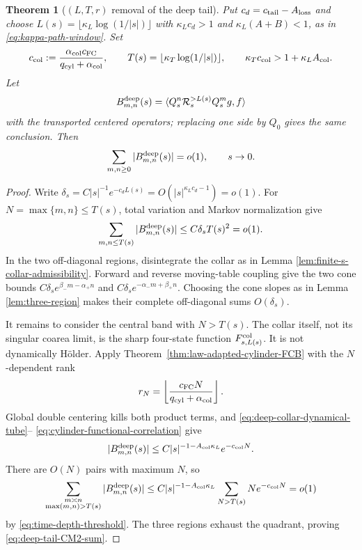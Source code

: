\documentclass[11pt]{article}
\newtheorem{theorem}{Theorem}[section]
\begin{document}
\begin{theorem}[$(L,T,r)$ removal of the deep tail]
\label{thm:time-depth-diagonal}
Put $c_d=c_{\rm tail}-A_{\rm loss}$ and choose
$L(s)=\lfloor\kappa_L\log(1/|s|)\rfloor$ with
$\kappa_Lc_d>1$ and $\kappa_L(A+B)<1$, as in
\eqref{eq:kappa-path-window}.  Set
\begin{equation}
\label{eq:time-depth-threshold}
 c_{\rm col}:=
 \frac{\alpha_{\rm col}c_{\rm FC}}
      {q_{\rm cyl}+\alpha_{\rm col}},\qquad
 T(s)=\lfloor\kappa_T\log(1/|s|)\rfloor,\qquad
 \kappa_Tc_{\rm col}>1+\kappa_LA_{\rm col}.
\end{equation}
Let
\[
 B^{\rm deep}_{m,n}(s)=
 \langle Q_s^n\mathcal R_s^{>L(s)}Q_s^mg,f\rangle
\]
with the transported centered operators; replacing one side by $Q_0$ gives
the same conclusion.  Then
\begin{equation}
\label{eq:deep-tail-CM2-sum}
 \sum_{m,n\ge0}|B^{\rm deep}_{m,n}(s)|=o(1),
 \qquad s\to0.
\end{equation}
\end{theorem}

\begin{proof}
Write
$\delta_s=C|s|^{-1}e^{-c_dL(s)}
=O(|s|^{\kappa_Lc_d-1})=o(1)$.
For $N=\max\{m,n\}\le T(s)$, total variation and Markov normalization give
\[
 \sum_{m,n\le T(s)}|B^{\rm deep}_{m,n}(s)|
 \le C\delta_sT(s)^2=o(1).
\]
In the two off-diagonal regions, disintegrate the collar as in Lemma
\ref{lem:finite-s-collar-admissibility}.  Forward and reverse moving-table
coupling give the two cone bounds
$C\delta_se^{\beta_-m-\alpha_+n}$ and
$C\delta_se^{-\alpha_-m+\beta_+n}$.  Choosing the cone slopes as in Lemma
\ref{lem:three-region} makes their complete off-diagonal sums $O(\delta_s)$.

It remains to consider the central band with $N>T(s)$.  The collar itself,
not its singular coarea limit, is the sharp four-state function
$F_{s,L(s)}^{\rm col}$.  It is not dynamically H\"older.  Apply
Theorem~\ref{thm:law-adapted-cylinder-FCB} with the $N$-dependent rank
\[
 r_N=\left\lfloor
 \frac{c_{\rm FC}N}{q_{\rm cyl}+\alpha_{\rm col}}
 \right\rfloor.
\]
Global double centering kills both product terms, and
\eqref{eq:deep-collar-dynamical-tube}--
\eqref{eq:cylinder-functional-correlation} give
\[
 |B^{\rm deep}_{m,n}(s)|
 \le C|s|^{-1-A_{\rm col}\kappa_L}e^{-c_{\rm col}N}.
\]
There are $O(N)$ pairs with maximum $N$, so
\[
 \sum_{\substack{m\asymp n\\\max(m,n)>T(s)}}
 |B^{\rm deep}_{m,n}(s)|
 \le C|s|^{-1-A_{\rm col}\kappa_L}
       \sum_{N>T(s)}Ne^{-c_{\rm col}N}=o(1)
\]
by \eqref{eq:time-depth-threshold}.  The three regions exhaust the quadrant,
proving \eqref{eq:deep-tail-CM2-sum}.
\end{proof}
\end{document}
